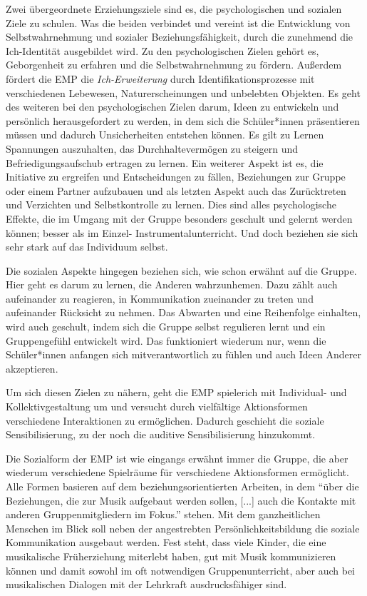 Zwei übergeordnete Erziehungsziele sind es, die psychologischen und sozialen
Ziele zu schulen. Was die beiden verbindet und vereint ist die Entwicklung von
Selbstwahrnehmung und sozialer Beziehungsfähigkeit, durch die zunehmend die
Ich-Identität ausgebildet wird. Zu den psychologischen Zielen gehört es,
Geborgenheit zu erfahren und die Selbstwahrnehmung zu fördern. Außerdem fördert
die EMP die \emph{Ich-Erweiterung} durch Identifikationsprozesse mit
verschiedenen Lebewesen, Naturerscheinungen und unbelebten Objekten. Es geht des
weiteren bei den psychologischen Zielen darum, Ideen zu entwickeln und
persönlich herausgefordert zu werden, in dem sich die Schüler*innen präsentieren
müssen und dadurch Unsicherheiten entstehen können. Es gilt zu Lernen Spannungen
auszuhalten, das Durchhaltevermögen zu steigern und Befriedigungsaufschub
ertragen zu lernen. Ein weiterer Aspekt ist es, die Initiative zu ergreifen und
Entscheidungen zu fällen, Beziehungen zur Gruppe oder einem Partner aufzubauen
und als letzten Aspekt auch das Zurücktreten und Verzichten und Selbstkontrolle
zu lernen. Dies sind alles psychologische Effekte, die im Umgang mit der Gruppe
besonders geschult und gelernt werden können; besser als im Einzel-
Instrumentalunterricht. Und doch beziehen sie sich sehr stark auf das Individuum
selbst.

Die sozialen Aspekte hingegen beziehen sich, wie schon erwähnt auf die Gruppe.
Hier geht es darum zu lernen, die Anderen wahrzunhemen. Dazu zählt auch
aufeinander zu reagieren, in Kommunikation zueinander zu treten und aufeinander
Rücksicht zu nehmen. Das Abwarten und eine Reihenfolge einhalten, wird auch
geschult, indem sich die Gruppe selbst regulieren lernt und ein Gruppengefühl
entwickelt wird. Das funktioniert wiederum nur, wenn die Schüler*innen anfangen
sich mitverantwortlich zu fühlen und auch Ideen Anderer akzeptieren.

Um sich diesen Zielen zu nähern, geht die EMP spielerich mit Individual- und
Kollektivgestaltung um und versucht durch vielfältige Aktionsformen verschiedene
Interaktionen zu ermöglichen. Dadurch geschieht die soziale Sensibilisierung, zu
der noch die auditive Sensibilisierung hinzukommt. 

Die Sozialform der EMP ist wie eingangs erwähnt immer die Gruppe, die aber
wiederum verschiedene Spielräume für verschiedene Aktionsformen ermöglicht. Alle
Formen basieren auf dem beziehungsorientierten Arbeiten, in dem \enquote{über
die Beziehungen, die zur Musik aufgebaut werden sollen, [...] auch die Kontakte
mit anderen Gruppenmitgliedern im Fokus.}
\autocite[10]{dartsch:kern_des_musizierens} stehen. Mit dem ganzheitlichen
Menschen im Blick soll neben der angestrebten Persönlichkeitsbildung die soziale
Kommunikation ausgebaut werden. Fest steht, dass viele Kinder, die eine
musikalische Früherziehung miterlebt haben, gut mit Musik kommunizieren können
und damit sowohl im oft notwendigen Gruppenunterricht, aber auch bei
musikalischen Dialogen mit der Lehrkraft ausdrucksfähiger sind.


